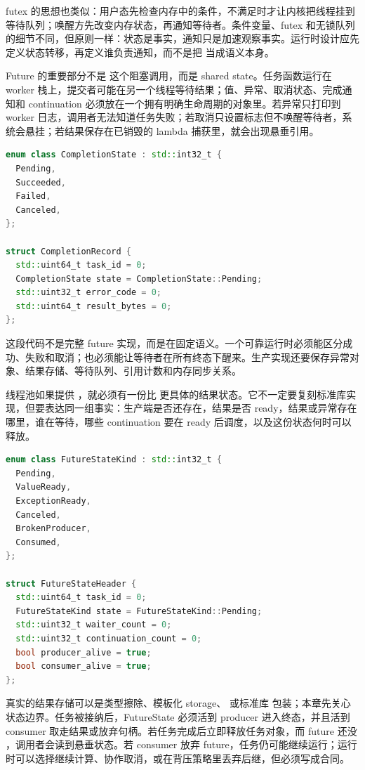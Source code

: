 futex 的思想也类似：用户态先检查内存中的条件，不满足时才让内核把线程挂到等待队列；唤醒方先改变内存状态，再通知等待者。条件变量、futex 和无锁队列的细节不同，但原则一样：状态是事实，通知只是加速观察事实。运行时设计应先定义状态转移，再定义谁负责通知，而不是把  当成语义本身。

Future 的重要部分不是  这个阻塞调用，而是 shared state。任务函数运行在 worker 栈上，提交者可能在另一个线程等待结果；值、异常、取消状态、完成通知和 continuation 必须放在一个拥有明确生命周期的对象里。若异常只打印到 worker 日志，调用者无法知道任务失败；若取消只设置标志但不唤醒等待者，系统会悬挂；若结果保存在已销毁的 lambda 捕获里，就会出现悬垂引用。

\begin{lstlisting}[language=C++,caption={Future 共享状态需要表达的语义}]
enum class CompletionState : std::int32_t {
  Pending,
  Succeeded,
  Failed,
  Canceled,
};

struct CompletionRecord {
  std::uint64_t task_id = 0;
  CompletionState state = CompletionState::Pending;
  std::uint32_t error_code = 0;
  std::uint64_t result_bytes = 0;
};
\end{lstlisting}

这段代码不是完整 future 实现，而是在固定语义。一个可靠运行时必须能区分成功、失败和取消；也必须能让等待者在所有终态下醒来。生产实现还要保存异常对象、结果存储、等待队列、引用计数和内存同步关系。

线程池如果提供 ，就必须有一份比  更具体的结果状态。它不一定要复刻标准库实现，但要表达同一组事实：生产端是否还存在，结果是否 ready，结果或异常存在哪里，谁在等待，哪些 continuation 要在 ready 后调度，以及这份状态何时可以释放。

\begin{lstlisting}[language=C++,caption={运行时 FutureState 的语义字段}]
enum class FutureStateKind : std::int32_t {
  Pending,
  ValueReady,
  ExceptionReady,
  Canceled,
  BrokenProducer,
  Consumed,
};

struct FutureStateHeader {
  std::uint64_t task_id = 0;
  FutureStateKind state = FutureStateKind::Pending;
  std::uint32_t waiter_count = 0;
  std::uint32_t continuation_count = 0;
  bool producer_alive = true;
  bool consumer_alive = true;
};
\end{lstlisting}

真实的结果存储可以是类型擦除、模板化 storage、 或标准库  包装；本章先关心状态边界。任务被接纳后，FutureState 必须活到 producer 进入终态，并且活到 consumer 取走结果或放弃句柄。若任务完成后立即释放任务对象，而 future 还没 ，调用者会读到悬垂状态。若 consumer 放弃 future，任务仍可能继续运行；运行时可以选择继续计算、协作取消，或在背压策略里丢弃后继，但必须写成合同。

